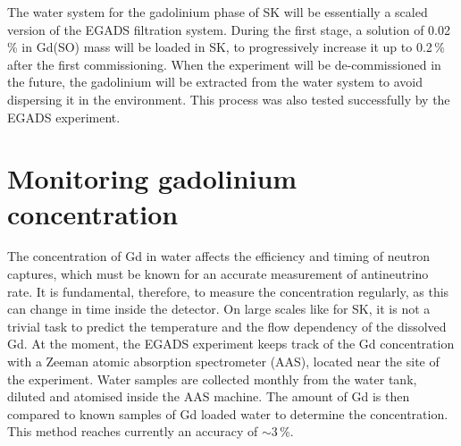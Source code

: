 The water system for the gadolinium phase of SK will be essentially a scaled version of the EGADS filtration system.
During the first stage, a solution of 0.02\,\% in Gd(SO) mass will be loaded in SK, %
to progressively increase it up to 0.2\,\% after the first commissioning.
When the experiment will be de-commissioned in the future, the gadolinium will be extracted from the water system %
to avoid dispersing it in the environment.
This process was also tested successfully by the EGADS experiment.

\section{Monitoring gadolinium concentration}
\label{sec:gad}

The concentration of Gd in water affects the efficiency and timing of neutron captures, %
which must be known for an accurate measurement of antineutrino rate.
It is fundamental, therefore, to measure the concentration regularly, as this can change in time inside the detector.
On large scales like for SK, it is not a trivial task to predict the temperature and the flow dependency %
of the dissolved Gd.
At the moment, the EGADS experiment keeps track of the Gd concentration with a Zeeman atomic absorption spectrometer (AAS), %
located near the site of the experiment.
Water samples are collected monthly from the water tank, diluted and atomised inside the AAS machine.
The amount of Gd is then compared to known samples of Gd loaded water to determine the concentration.
This method reaches currently an accuracy of $\sim3$\,\%.

